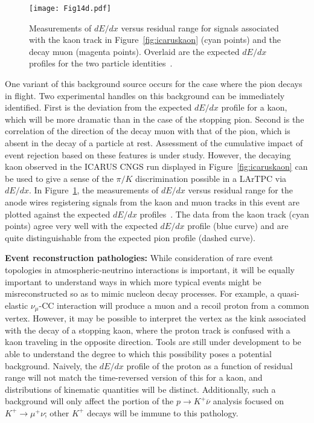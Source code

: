 %
\begin{figure}[!htb]
\centering
\centering
\texttt{[image: Fig14d.pdf]}
\caption[$dE/dx$ profile of decaying kaon in the ICARUS CNGS run]
        {Measurements of $dE/dx$ versus residual range for signals
          associated with the kaon track in Figure~\ref{fig:icaruskaon} (cyan points) and the decay muon
          (magenta points).  Overlaid are the expected $dE/dx$ profiles for the
          two particle identities~\cite{Antonello:2012hu}. }
\label{fig:pdkdedx}
\end{figure}
One variant of this background source occurs for the case where the
pion decays in flight.  Two experimental handles on this background
can be immediately identified.  First is the deviation from the
expected $dE/dx$ profile for a kaon, which will be more dramatic than
in the case of the stopping pion.  Second is the correlation of the
direction of the decay muon with that of the pion, which is absent in
the decay of a particle at rest.  Assessment of the cumulative impact
of event rejection based on these features is under study.  However,
the decaying kaon observed in the ICARUS CNGS run displayed in 
Figure~\ref{fig:icaruskaon} can be used to give a sense of the 
$\pi/K$ discrimination possible in a LArTPC via $dE/dx$.   
In Figure~\ref{fig:pdkdedx}, the measurements
of $dE/dx$ versus residual range for the anode wires registering
signals from the kaon and muon tracks in this event are plotted
against the expected $dE/dx$ profiles~\cite{Antonello:2012hu}. The
data from the kaon track (cyan points) agree very well with the
expected $dE/dx$ profile (blue curve) and are quite distinguishable
from the expected pion profile (dashed curve).

\textbf{\boldmath Event reconstruction pathologies:}
While consideration of rare event topologies in atmospheric-neutrino 
interactions is important, it will be equally important to understand 
ways in which more typical events might be misreconstructed so as 
to mimic nucleon decay processes.  For example, a quasi-elastic 
$\nu_\mu$-CC interaction will produce a muon and a recoil
proton from a common vertex.  However, it may be possible to interpret 
the vertex as the kink associated with the decay of a stopping kaon, 
where the proton track is confused with a kaon traveling in the opposite 
direction.  Tools are still under development to be able to understand 
the degree to which this possibility poses a potential background.  
Naively, the $dE/dx$ profile of the proton as a function of residual range 
will not match the time-reversed version of this for a kaon, 
and distributions of kinematic quantities will be 
distinct.  Additionally, such a background will only affect 
the portion of the $p\to K^+\overline{\nu}$ analysis focused 
on $K^+\to \mu^+\nu$; other $K^+$ decays will be immune to this 
pathology.  

